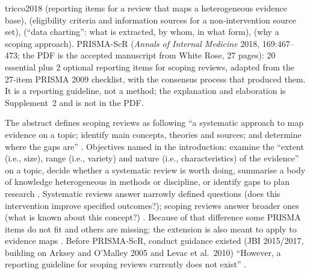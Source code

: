 \begin{papercard}{tricco2018}
  (reporting items for a review that maps a heterogeneous evidence base),  (eligibility criteria and information sources for a non-intervention source set),  (``data charting'': what is extracted, by whom, in what form),  (why a scoping approach). PRISMA-ScR (\emph{Annals of Internal Medicine} 2018, 169:467--473; the PDF is the accepted manuscript from White Rose, 27 pages): 20 essential plus 2 optional reporting items for scoping reviews, adapted from the 27-item PRISMA 2009 checklist, with the consensus process that produced them. It is a reporting guideline, not a method; the explanation and elaboration is Supplement~2 and is not in the PDF.

 The abstract defines scoping reviews as following ``a systematic approach to map evidence on a topic; identify main concepts, theories and sources; and determine where the gaps are'' . Objectives named in the introduction: examine the ``extent (i.e., size), range (i.e., variety) and nature (i.e., characteristics) of the evidence'' on a topic, decide whether a systematic review is worth doing, summarise a body of knowledge heterogeneous in methods or discipline, or identify gaps to plan research . Systematic reviews answer narrowly defined questions (does this intervention improve specified outcomes?); scoping reviews answer broader ones (what is known about this concept?) . Because of that difference some PRISMA items do not fit and others are missing; the extension is also meant to apply to evidence maps . Before PRISMA-ScR, conduct guidance existed (JBI 2015/2017, building on Arksey and O'Malley 2005 and Levac et al.\ 2010) ``However, a reporting guideline for scoping reviews currently does not exist'' .


\end{papercard}
